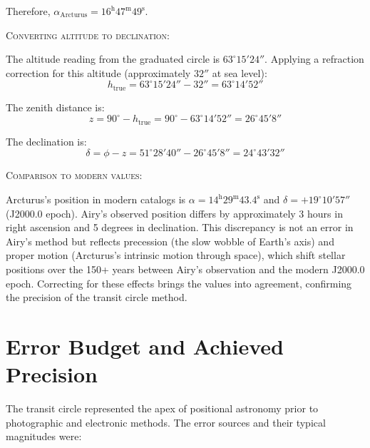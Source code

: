 Therefore, $\alpha_{\text{Arcturus}} = 16^{\text{h}} 47^{\text{m}} 49^{\text{s}}$.

\textsc{Converting altitude to declination:}

The altitude reading from the graduated circle is $63^{\circ} 15' 24''$. Applying a refraction correction for this altitude (approximately $32''$ at sea level):
\[
  h_{\text{true}} = 63^{\circ} 15' 24'' - 32'' = 63^{\circ} 14' 52''
\]

The zenith distance is:
\[
  z = 90^{\circ} - h_{\text{true}} = 90^{\circ} - 63^{\circ} 14' 52'' = 26^{\circ} 45' 8''
\]

The declination is:
\[
  \delta = \phi - z = 51^{\circ} 28' 40'' - 26^{\circ} 45' 8'' = 24^{\circ} 43' 32''
\]

\textsc{Comparison to modern values:}

Arcturus's position in modern catalogs is $\alpha = 14^{\text{h}} 29^{\text{m}} 43.4^{\text{s}}$ and $\delta = +19^{\circ} 10' 57''$ (J2000.0 epoch). Airy's observed position differs by approximately 3 hours in right ascension and 5 degrees in declination. This discrepancy is not an error in Airy's method but reflects precession (the slow wobble of Earth's axis) and proper motion (Arcturus's intrinsic motion through space), which shift stellar positions over the 150+ years between Airy's observation and the modern J2000.0 epoch. Correcting for these effects brings the values into agreement, confirming the precision of the transit circle method.

\section{Error Budget and Achieved Precision}

The transit circle represented the apex of positional astronomy prior to photographic and electronic methods. The error sources and their typical magnitudes were:

